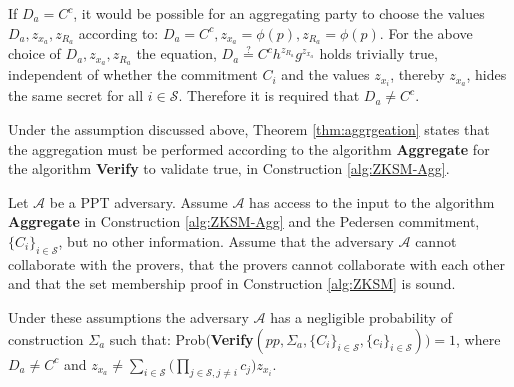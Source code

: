If $D_a =  C^c$, it would be possible for an aggregating party to choose the values $D_a,z_{x_a},z_{R_a}$ according to: $D_a =C^c, z_{x_a} = \phi(p), z_{R_a} = \phi(p)$.
For the above choice of $D_a,z_{x_a},z_{R_a}$ the equation, $D_a\overset{?}{=} C^c h^{z_{R_a}}g^{z_{x_a}}$ holds trivially true, independent of whether the commitment $C_i$ and the values $z_{x_i}$, thereby $z_{x_a}$, hides the same secret for all $i\in\mathcal{S}$. Therefore it is required that $D_a \neq C^c$.


Under the assumption discussed above, Theorem \ref{thm:aggrgeation} states that the  aggregation must be performed according to the algorithm \textbf{Aggregate} for the algorithm \textbf{Verify} to validate true, in Construction \ref{alg:ZKSM-Agg}. 
\vspace{0.5cm}
\begin{thm}
\label{thm:aggrgeation}
Let $\mathcal{A}$ be a PPT adversary. Assume $\mathcal{A}$ has access to the input to the algorithm \textbf{Aggregate} in Construction \ref{alg:ZKSM-Agg} and the Pedersen commitment, $\{C_i\}_{i\in\mathcal{S}}$, but no other information. Assume that the adversary  $\mathcal{A}$ cannot collaborate with the provers, that the provers cannot collaborate with each other and that the set membership proof in Construction \ref{alg:ZKSM} is sound. 



Under these assumptions the adversary $\mathcal{A}$ has a negligible probability of construction $\Sigma_a$ such that: Prob$($\textbf{Verify}$(pp,\Sigma_a,\{C_i\}_{i\in\mathcal{S}},\{c_i\}_{i\in\mathcal{S}}) )=1$, where $D_a\neq C^c$ and  $z_{x_a} \neq \sum_{i\in\mathcal{S}} \Big( \prod_{j\in\mathcal{S}, j\neq i} c_j \big) z_{x_i}$. 


\end{thm}

